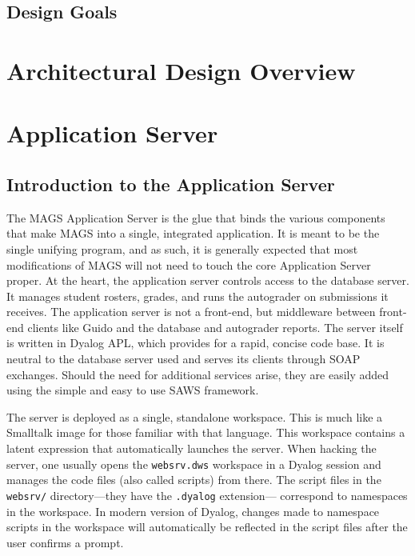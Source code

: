 \section{Design Goals}



\chapter{Architectural Design Overview}

\chapter{Application Server}

\section{Introduction to the Application Server}

\noindent
The MAGS Application Server is the glue that binds the various components that 
make MAGS into a single, integrated application.  It is meant to be the single
unifying program, and as such, it is generally expected that most modifications
of MAGS will not need to touch the core Application Server proper.  At the 
heart, the application server controls access to the database server.  It manages
student rosters, grades, and runs the autograder on submissions it receives.
The application server is not a front-end, but middleware between front-end
clients like Guido and the database and autograder reports.
The server itself is written in Dyalog APL, which provides for a rapid, concise 
code base.  It is neutral to the database server used and serves its clients 
through SOAP exchanges.  Should the need for additional services arise, 
they are easily added using the simple and easy to use SAWS framework.

The server is deployed as a single, standalone workspace.  This is much like a 
Smalltalk image for those familiar with that language.  This workspace contains
a latent expression that automatically launches the server.  When hacking the 
server, one usually opens the {\tt websrv.dws} workspace in a Dyalog session
and manages the code files (also called scripts) from there.  The script files 
in the {\tt websrv/} directory---they have the {\tt .dyalog} extension---
correspond to namespaces in the workspace.  In modern version of Dyalog, 
changes made to namespace scripts in the workspace will automatically be 
reflected in the script files after the user confirms a prompt.

